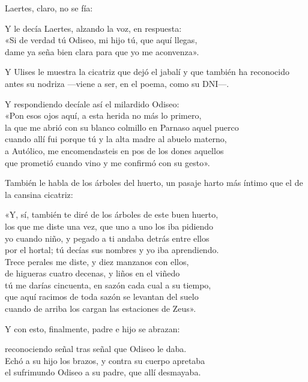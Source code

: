 Laertes, claro, no se fía:

\begin{versocita}
Y le decía Laertes, alzando la voz, en respuesta:\\
«Si de verdad tú Odiseo, mi hijo tú, que aquí llegas,\\
dame ya seña bien clara para que yo me aconvenza».
\end{versocita}

Y Ulises le muestra la cicatriz que dejó el jabalí y que también ha reconocido antes su nodriza ---viene a ser, en el poema, como su DNI---.

\begin{versocita}
Y respondiendo decíale así el milardido Odiseo:\\
«Pon esos ojos aquí, a esta herida no más lo primero,\\
la que me abrió con su blanco colmillo en Parnaso aquel puerco\\
cuando allí fui porque tú y la alta madre al abuelo materno,\\
a Autólico, me encomendasteis en pos de los dones aquellos\\
que prometió cuando vino y me confirmó con su gesto».
\end{versocita}

También le habla de los árboles del huerto, un pasaje harto más íntimo que el de la cansina cicatriz:

\begin{versocita}
«Y, sí, también te diré de los árboles de este buen huerto,\\
los que me diste una vez, que uno a uno los iba pidiendo\\
yo cuando niño, y pegado a ti andaba detrás entre ellos\\
por el hortal; tú decías sus nombres y yo iba aprendiendo.\\
Trece perales me diste, y diez manzanos con ellos,\\
de higueras cuatro decenas, y liños en el viñedo\\
tú me darías cincuenta, en sazón cada cual a su tiempo,\\
que aquí racimos de toda sazón se levantan del suelo\\
cuando de arriba los cargan las estaciones de Zeus».
\end{versocita}

Y con esto, finalmente, padre e hijo se abrazan:

\begin{versocita}
[...] reconociendo señal tras señal que Odiseo le daba.\\
Echó a su hijo los brazos, y contra su cuerpo apretaba\\
el sufrimundo Odiseo a su padre, que allí desmayaba.
\end{versocita}

